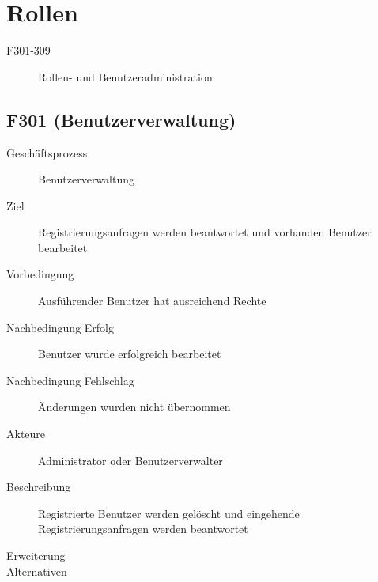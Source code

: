 \section{Rollen}
\begin{description}
  \item[F301-309]Rollen- und Benutzeradministration
\end{description}

\subsection{F301 (Benutzerverwaltung)}
\begin{description}
  \item[Geschäftsprozess]Benutzerverwaltung
  \item[Ziel]Registrierungsanfragen werden beantwortet und vorhanden Benutzer bearbeitet
  \item[Vorbedingung]Ausführender Benutzer hat ausreichend Rechte
  \item[Nachbedingung Erfolg]Benutzer wurde erfolgreich bearbeitet
  \item[Nachbedingung Fehlschlag]Änderungen wurden nicht übernommen
  \item[Akteure]Administrator oder Benutzerverwalter
  \item[Beschreibung]Registrierte Benutzer werden gelöscht und eingehende Registrierungsanfragen werden beantwortet
  \item[Erweiterung]
  \item[Alternativen]
\end{description}

